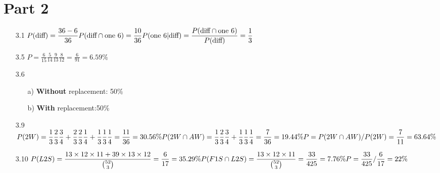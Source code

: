 \documentclass{article}
\begin{document}
\section*{Part 2}
\begin{itemize}
    \item [3.1]\(\displaystyle
    P(\text{diff}) = \frac{36-6}{36}\\
    P(\text{diff}\cap\text{one 6}) = \frac{10}{36}\\
    P(\text{one 6}|\text{diff}) = \frac{P(\text{diff}\cap\text{one 6})}{P(\text{diff})} = \frac{1}{3}
    \)
    \item [3.5]\(\displaystyle
    P = \frac{6}{15}\frac{5}{14}\frac{9}{13}\frac{8}{12} = \frac{6}{91} = 6.59\%
    \)
    \item [3.6]
    \begin{itemize}
        \item [a)] \textbf{Without} replacement: 50\%
        \item [b)] \textbf{With} replacement:50\%
    \end{itemize}
    \item [3.9]\(\displaystyle
    P(2W) = \frac{1}{3}\frac{2}{3}\frac{3}{4}+\frac{2}{3}\frac{2}{3}\frac{1}{4}+\frac{1}{3}\frac{1}{3}\frac{1}{4} = \frac{11}{36}=30.56\%\\
    P(2W\cap AW) = \frac{1}{3}\frac{2}{3}\frac{3}{4}+\frac{1}{3}\frac{1}{3}\frac{1}{4} = \frac{7}{36} = 19.44\%\\
    P = P(2W\cap AW)/P(2W) = \frac{7}{11} = 63.64\%
    \)
    \item [3.10]\(\displaystyle
    P(L2S) = \frac{13\times12\times11+39\times13\times12}{\binom{52}{3}}=\frac{6}{17} = 35.29\%\\
    P(F1S\cap L2S) = \frac{13\times12\times11}{\binom{52}{3}}=\frac{33}{425} = 7.76\%\\
    P = \frac{33}{425}/\frac{6}{17}=22\%
    \)
\end{itemize}
\newpage
\end{document}
